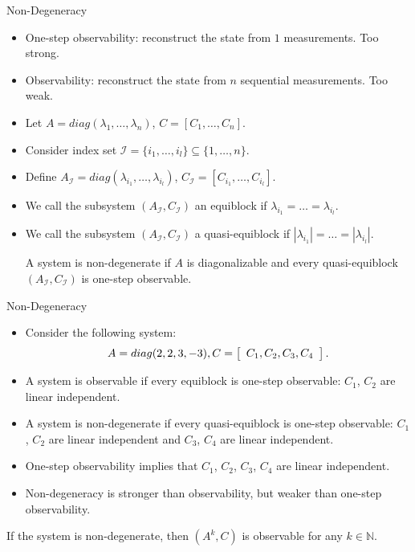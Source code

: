 \documentclass{beamer}
\begin{document}
  \begin{frame}{Non-Degeneracy}
    \begin{itemize}
      \item One-step observability: reconstruct the state from $1$ measurements. Too strong. 
      \item Observability: reconstruct the state from $n$ sequential measurements. Too weak.
      \item Let $A = diag(\lambda_1,\ldots,\lambda_n)$, $C = [C_1,\ldots, C_n]$.
      \item Consider index set $\mathcal I = \{i_1,\ldots,i_l\}\subseteq \{1,\ldots,n\}$.
      \item Define $A_{\mathcal I} = diag(\lambda_{i_1},\ldots,\lambda_{i_l})$, $C_{\mathcal I} = [C_{i_1},\ldots,C_{i_l}]$.
      \item We call the subsystem $(A_{\mathcal I}, C_{\mathcal I})$ an equiblock if $\lambda_{i_1}=\ldots=\lambda_{i_l}$. 
      \item We call the subsystem $(A_{\mathcal I}, C_{\mathcal I})$ a quasi-equiblock if $|\lambda_{i_1}|=\ldots=|\lambda_{i_l}|$. 
	\begin{definition}
	  A system is non-degenerate if $A$ is diagonalizable and every quasi-equiblock $(A_{\mathcal I},C_{\mathcal I})$ is one-step observable.
	\end{definition}
    \end{itemize}
  \end{frame}

  \begin{frame}{Non-Degeneracy}
    \begin{itemize}
      \item Consider the following system: 
	\begin{displaymath}
	  \begin{split}
	    A = diag(2,2,3,-3), C = \left[ {\begin{array}{*{20}c}
	      C_1,C_2,C_3,C_4
	    \end{array}} \right].
	  \end{split}
	\end{displaymath}
      \item A system is observable if every equiblock is one-step observable: $C_1$, $C_2$ are linear independent.
      \item A system is non-degenerate if every quasi-equiblock is one-step observable: $C_1$, $C_2$ are linear independent and $C_3$, $C_4$ are linear independent.
      \item One-step observability implies that $C_1$, $C_2$, $C_3$, $C_4$ are linear independent.
      \item Non-degeneracy is stronger than observability, but weaker than one-step observability. 
    \end{itemize}
    \begin{theorem}
      If the system is non-degenerate, then $(A^k,C)$ is observable for any $k\in \mathbb N$. 
    \end{theorem}
  \end{frame}
\end{document}
